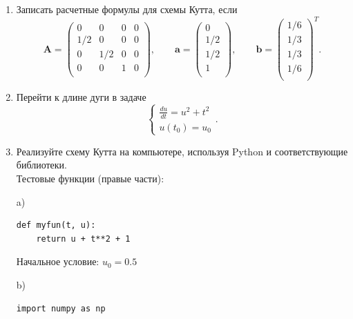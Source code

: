 \documentclass{article}
\begin{document}
\begin{enumerate}
\item Записать расчетные формулы для схемы Кутта, если
\begin{equation} \label{c2eq4}
	\mathbf{A} = 
		\begin{pmatrix}
		0 & 0 & 0 & 0 \\
		1/2 & 0 & 0 & 0 \\
		0 & 1/2 & 0 & 0 \\
		0 & 0 & 1 & 0 \\
		\end{pmatrix},
	\qquad
	\mathbf{a} = 
		\begin{pmatrix}
		0 \\
		1/2 \\
		1/2 \\
		1 \\
		\end{pmatrix},
	\qquad
	\mathbf{b} = 
		\begin{pmatrix}
		1/6 \\
		1/3 \\
		1/3 \\
		1/6 \\
		\end{pmatrix}^T.
\end{equation}
\item Перейти к длине дуги в задаче
\begin{equation} \label{c2eq5}
	\begin{cases}
		\displaystyle \frac{du}{dt} = u^2 + t^2 \\
		u(t_0) = u_0
	\end{cases}.
\end{equation}
\item Реализуйте схему Кутта на компьютере, используя Python и соответствующие библиотеки.\\
Тестовые функции (правые части):

a)
\begin{verbatim}
def myfun(t, u):
    return u + t**2 + 1
\end{verbatim}
Начальное условие: $u_0 = 0.5$

b)
\begin{verbatim}
import numpy as np


\end{verbatim}
\end{enumerate}
\end{document}
